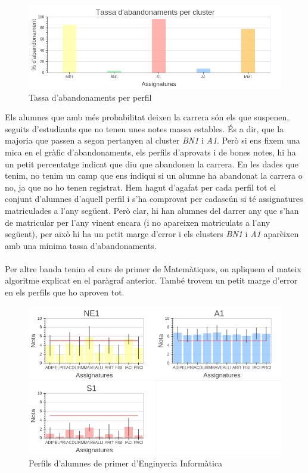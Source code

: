 \documentclass[12pt,a4paper,catalan]{article}
\begin{document}
\begin{figure}[h]
\centering
\includegraphics[width=\linewidth]{img/abandonaments_primer_info.png}
\caption{Tassa d'abandonaments per perfil}
\label{fig:abandonamentprimer}
\end{figure}

Els alumnes que amb més probabilitat deixen la carrera són els que suspenen, seguits d'estudiants que no tenen unes notes massa estables. És a dir, que la majoria que passen a segon pertanyen al cluster \textit{BN1} i \textit{A1}. Però si ens fixem una mica en el gràfic d'abandonaments, els perfils d'aprovats i de bones notes, hi ha un petit percentatge indicat que diu que abandonen la carrera. En les dades que tenim, no tenim un camp que ens indiqui si un alumne ha abandonat la carrera o no, ja que no ho tenen registrat. Hem hagut d'agafat per cada perfil tot el conjunt d'alumnes d'aquell perfil i s'ha comprovat per cadascún si té assignatures matriculades a l'any següent. Però clar, hi han alumnes del darrer any que s'han de matricular per l'any vinent encara (i no apareixen matriculats a l'any següent), per això hi ha un petit marge d'error i els clusters \textit{BN1} i \textit{A1} aparèixen amb una mínima tassa d'abandonaments. 
\\
\\
Per altre banda tenim el curs de primer de Matemàtiques, on apliquem el mateix algoritme explicat en el paràgraf anterior. També trovem un petit marge d'error en els perfils que ho aproven tot.

\begin{figure}[h]
\centering
\includegraphics[width=\linewidth]{img/perfils_primer_mates.png}
\caption{Perfils d'alumnes de primer d'Enginyeria Informàtica}
\end{figure}
\end{document}
